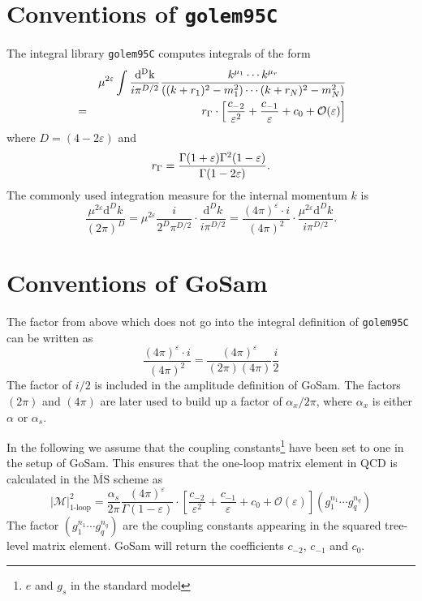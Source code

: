 \documentclass[11pt,a4paper]{refrep}
\newcommand{\gosamversion}{{3{.}0}}
\newcommand{\gosamv}[1][\gosamversion]{{\sc GoSam}\xspace}
\newcommand{\golemVC}{{\tt golem95C}\xspace}
\newcommand{\diff}[1][{}]{{\mathrm{d}}^{#1}\!}
\newcommand{\nn}{\nonumber}
\begin{document}
\section{Conventions of \golemVC}
The integral library \golemVC{} computes integrals of the form
\begin{eqnarray}
&&\mu^{2\varepsilon}\int\frac{\mathrm{d^D k}}{i\pi^{D/2}}\frac{k^{\mu_1}\cdots k^{\mu_r}}{%
((k+r_1)^2-m_1^2)\cdots(k+r_N)^2-m_N^2)}\nn\\
&=&r_\Gamma\cdot\left[\frac{c_{-2}}{\varepsilon^2}+\frac{c_{-1}}{\varepsilon}+c_0
+{\mathcal{O}}(\varepsilon)\right]
\end{eqnarray}
where $D=(4-2\varepsilon)$ and
\begin{equation}
r_\Gamma=\frac{\Gamma(1+\varepsilon)\Gamma^2(1-\varepsilon)}{%
   \Gamma(1-2\varepsilon)}.
\end{equation}
The commonly used integration measure for the internal momentum $k$ is
\begin{equation}
\frac{\mu^{2\varepsilon}\diff[D]k}{(2\pi)^D}
=\mu^{2\varepsilon}\frac{i}{2^D\pi^{D/2}}\cdot\frac{{\mathrm d}^Dk}{i\pi^{D/2}}
=\frac{(4\pi)^\varepsilon \cdot i}{(4\pi)^2}\cdot%
 \frac{\mu^{2\varepsilon}{\mathrm d}^Dk}{i\pi^{D/2}}.
\end{equation}

\section{Conventions of \gosamv}
The factor from above which does not go into the integral definition of
\golemVC{} can be written as
\begin{equation}
\frac{(4\pi)^\varepsilon \cdot i}{(4\pi)^2}=
\frac{(4\pi)^\varepsilon}{(2\pi)(4\pi)}\frac{i}{2}
\end{equation}
The factor of $i/2$ is included in the amplitude definition of \gosamv{}.
The factors $(2\pi)$ and $(4\pi)$ are later used to build up a factor of
$\alpha_x/2\pi$, where $\alpha_x$ is either $\alpha$ or $\alpha_s$.

In the following we assume that the coupling constants\footnote{
$e$ and $g_s$ in the standard model} have been set to one in the
setup of \gosamv{}. This ensures that the one-loop matrix
element in QCD is calculated in the $\overline{\mathrm{MS}}$ scheme as
\begin{equation}
\left\vert\mathcal{M}\right\vert^2_{\text{1-loop}}=
\frac{\alpha_s}{2\pi}\frac{(4\pi)^\varepsilon}{\Gamma(1-\varepsilon)}
\cdot\left[\frac{c_{-2}}{\varepsilon^2}+\frac{c_{-1}}{\varepsilon}+c_0
+{\mathcal{O}}(\varepsilon)\right](g_1^{n_1}\cdots g_q^{n_q})
\end{equation}
The factor $(g_1^{n_1}\cdots g_q^{n_q})$ are the coupling constants
appearing in the squared tree-level matrix element. \gosamv{} will
return the coefficients $c_{-2}$, $c_{-1}$ and $c_0$.
\end{document}
